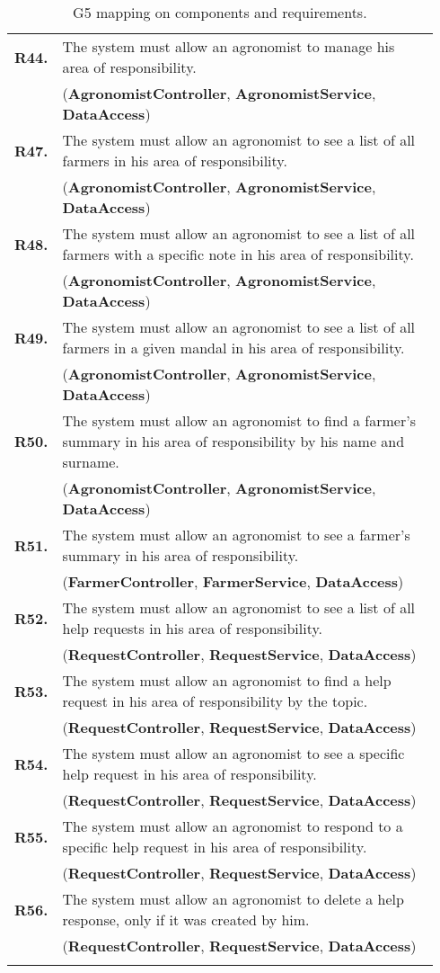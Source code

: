 \begin{longtable}{p{0.06\linewidth} p{0.88\linewidth}}
	\textbf{R44.} & The system must allow an agronomist to manage his area of responsibility.\\
	& (\textbf{AgronomistController}, \textbf{AgronomistService}, \textbf{DataAccess})\\
	\textbf{R47.} & The system must allow an agronomist to see a list of all farmers in his area of responsibility.\\
	& (\textbf{AgronomistController}, \textbf{AgronomistService}, \textbf{DataAccess})\\
	\textbf{R48.} & The system must allow an agronomist to see a list of all farmers with a specific note in his area of responsibility.\\
	& (\textbf{AgronomistController}, \textbf{AgronomistService}, \textbf{DataAccess})\\
	\textbf{R49.} & The system must allow an agronomist to see a list of all farmers in a given mandal in his area of responsibility.\\
	& (\textbf{AgronomistController}, \textbf{AgronomistService}, \textbf{DataAccess})\\
	\textbf{R50.} & The system must allow an agronomist to find a farmer's summary in his area of responsibility by his name and surname.\\
	& (\textbf{AgronomistController}, \textbf{AgronomistService}, \textbf{DataAccess})\\
	\textbf{R51.} & The system must allow an agronomist to see a farmer's summary in his area of responsibility.\\
	& (\textbf{FarmerController}, \textbf{FarmerService}, \textbf{DataAccess})\\
	\textbf{R52.} & The system must allow an agronomist to see a list of all help requests in his area of responsibility.\\
	& (\textbf{RequestController}, \textbf{RequestService}, \textbf{DataAccess})\\
	\textbf{R53.} & The system must allow an agronomist to find a help request in his area of responsibility by the topic.\\
	& (\textbf{RequestController}, \textbf{RequestService}, \textbf{DataAccess})\\
	\textbf{R54.} & The system must allow an agronomist to see a specific help request in his area of responsibility.\\
	& (\textbf{RequestController}, \textbf{RequestService}, \textbf{DataAccess})\\
	\textbf{R55.} & The system must allow an agronomist to respond to a specific help request in his area of responsibility.\\
	& (\textbf{RequestController}, \textbf{RequestService}, \textbf{DataAccess})\\
	\textbf{R56.} & The system must allow an agronomist to delete a help response, only if it was created by him.\\
	& (\textbf{RequestController}, \textbf{RequestService}, \textbf{DataAccess})\\

    \bottomrule
    \caption{G5 mapping on components and requirements.}
\end{longtable}

